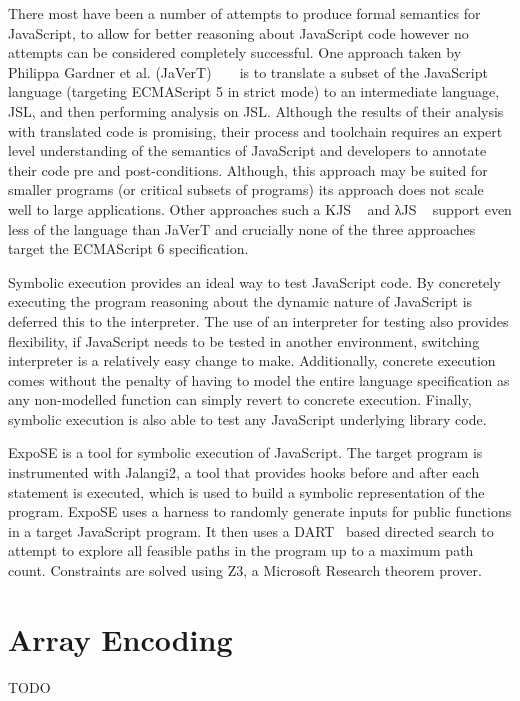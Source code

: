 \documentclass[]{final_report}
\begin{document}
There most have been a number of attempts to produce formal semantics for JavaScript, to allow for better reasoning about JavaScript code however no attempts can be considered completely successful. One approach taken by Philippa Gardner et al. (JaVerT) ~\cite{gardner2012towards} ~\cite{guha2010essence} is to translate a subset of the JavaScript language (targeting ECMAScript 5 in strict mode) to an intermediate language, JSL, and then performing analysis on JSL. Although the results of their analysis with translated code is promising, their process and toolchain requires an expert level understanding of the semantics of JavaScript and developers to annotate their code pre and post-conditions. Although, this approach may be suited for smaller programs (or critical subsets of programs) its approach does not scale well to large applications. Other approaches such a KJS ~\cite{park2015kjs} and λJS ~\cite{guha2010essence} support even less of the language than JaVerT and crucially none of the three approaches target the ECMAScript 6 specification.

Symbolic execution provides an ideal way to test JavaScript code. By concretely executing the program reasoning about the dynamic nature of JavaScript is deferred this to the interpreter. The use of an interpreter for testing also provides flexibility, if JavaScript needs to be tested in another environment, switching interpreter is a relatively easy change to make. Additionally, concrete execution comes without the penalty of having to model the entire language specification as any non-modelled function can simply revert to concrete execution. Finally, symbolic execution is also able to test any JavaScript underlying library code.

ExpoSE is a tool for symbolic execution of JavaScript. The target program is instrumented with Jalangi2, a tool that provides hooks before and after each statement is executed, which is used to build a symbolic representation of the program. ExpoSE uses a harness to randomly generate inputs for public functions in a target JavaScript program. It then uses a DART~\cite{godefroid2005dart} based directed search to attempt to explore all feasible paths in the program up to a maximum path count. Constraints are solved using Z3, a Microsoft Research theorem prover.

\section{Array Encoding}
TODO
\end{document}
